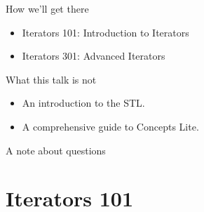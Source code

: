 \documentclass[aspectratio=169]{beamer}
\begin{document}

\begin{frame}{How we'll get there}
  \begin{itemize}
    \Large
  \item<1>[] Iterators 101: Introduction to Iterators
  \item<2>[] Iterators 301: Advanced Iterators
  \end{itemize}
  \begin{center}
  \end{center}
\end{frame}


\begin{frame}{What this talk is not}
  \begin{itemize}
  \item An introduction to the STL.
  \item A comprehensive guide to Concepts Lite.
  \end{itemize}
\end{frame}


\begin{frame}{A note about questions}
\end{frame}






\section{Iterators 101}



\end{document}
